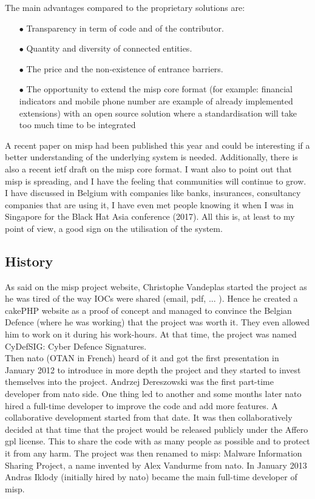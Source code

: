 \documentclass{eplmastersthesis}
\begin{document}
The main advantages compared to the proprietary solutions are:
\begin{itemize}
\item[$\bullet$] Transparency in term of code and of the contributor.
\item[$\bullet$] Quantity and diversity of connected entities.
\item[$\bullet$] The price and the non-existence of entrance barriers.
\item[$\bullet$] The opportunity to extend the \gls{misp} core format (for example: financial indicators and mobile phone number are example of already implemented extensions) with an open source solution where a standardisation will take too much time to be integrated
\end{itemize}

A recent paper on \gls{misp} \cite{wagner2016misp} had been published this year and could be interesting if a better understanding of the underlying system is needed. Additionally, there is also a recent \gls{ietf} draft on the \gls{misp} core format\cite{MispDraft}.
I want also to point out that \gls{misp} is spreading, and I have the feeling that communities will continue to grow. I have discussed in Belgium with companies like banks, insurances, consultancy companies that are using it, I have even met people knowing it when I was in Singapore for the Black Hat Asia conference (2017). All this is, at least to my point of view, a good sign on the utilisation of the system.

\subsection{History}
As said on the \gls{misp} project website, Christophe Vandeplas started the project as he was tired of the way IOCs were shared (email, pdf, ... ). Hence he created a cakePHP website as a proof of concept and managed to convince the Belgian Defence (where he was working) that the project was worth it. They even allowed him to work on it during his work-hours. At that time, the project was named CyDefSIG: Cyber Defence Signatures.\\

Then \gls{nato} (OTAN in French) heard of it and got the first presentation in January 2012 to introduce in more depth the project and they started to invest themselves into the project. Andrzej Dereszowski was the first part-time developer from  \gls{nato} side.
One thing led to another and some months later  \gls{nato} hired a full-time developer to improve the code and add more features. A collaborative development started from that date. 
It was then collaboratively decided at that time that the project would be released publicly under the Affero \gls{gpl} license. This to share the code with as many people as possible and to protect it from any harm.
The project was then renamed to \gls{misp}: Malware Information Sharing Project, a name invented by Alex Vandurme from  \gls{nato}.
In January 2013 Andras Iklody (initially hired by  \gls{nato}) became the main full-time developer of \gls{misp}.\\
\end{document}
